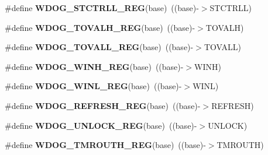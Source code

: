 \begin{DoxyCompactItemize}
\item 
\#define {\bfseries W\+D\+O\+G\+\_\+\+S\+T\+C\+T\+R\+L\+L\+\_\+\+R\+EG}(base)~((base)-\/$>$S\+T\+C\+T\+R\+LL)\hypertarget{group__WDOG__Register__Accessor__Macros_ga9390a99165a8ed47a8d47310dd1b7a44}{}\label{group__WDOG__Register__Accessor__Macros_ga9390a99165a8ed47a8d47310dd1b7a44}

\item 
\#define {\bfseries W\+D\+O\+G\+\_\+\+T\+O\+V\+A\+L\+H\+\_\+\+R\+EG}(base)~((base)-\/$>$T\+O\+V\+A\+LH)\hypertarget{group__WDOG__Register__Accessor__Macros_ga3495178bd50541f858403de84b2132df}{}\label{group__WDOG__Register__Accessor__Macros_ga3495178bd50541f858403de84b2132df}

\item 
\#define {\bfseries W\+D\+O\+G\+\_\+\+T\+O\+V\+A\+L\+L\+\_\+\+R\+EG}(base)~((base)-\/$>$T\+O\+V\+A\+LL)\hypertarget{group__WDOG__Register__Accessor__Macros_ga5867725d00829838e63aa304cd8e571e}{}\label{group__WDOG__Register__Accessor__Macros_ga5867725d00829838e63aa304cd8e571e}

\item 
\#define {\bfseries W\+D\+O\+G\+\_\+\+W\+I\+N\+H\+\_\+\+R\+EG}(base)~((base)-\/$>$W\+I\+NH)\hypertarget{group__WDOG__Register__Accessor__Macros_ga044a2078fb0f549de3bd68c329f4defb}{}\label{group__WDOG__Register__Accessor__Macros_ga044a2078fb0f549de3bd68c329f4defb}

\item 
\#define {\bfseries W\+D\+O\+G\+\_\+\+W\+I\+N\+L\+\_\+\+R\+EG}(base)~((base)-\/$>$W\+I\+NL)\hypertarget{group__WDOG__Register__Accessor__Macros_ga6de8f153524881bc674e0c1bf87529f3}{}\label{group__WDOG__Register__Accessor__Macros_ga6de8f153524881bc674e0c1bf87529f3}

\item 
\#define {\bfseries W\+D\+O\+G\+\_\+\+R\+E\+F\+R\+E\+S\+H\+\_\+\+R\+EG}(base)~((base)-\/$>$R\+E\+F\+R\+E\+SH)\hypertarget{group__WDOG__Register__Accessor__Macros_ga3ea0555f4cb61c5280404f2a46b2895d}{}\label{group__WDOG__Register__Accessor__Macros_ga3ea0555f4cb61c5280404f2a46b2895d}

\item 
\#define {\bfseries W\+D\+O\+G\+\_\+\+U\+N\+L\+O\+C\+K\+\_\+\+R\+EG}(base)~((base)-\/$>$U\+N\+L\+O\+CK)\hypertarget{group__WDOG__Register__Accessor__Macros_ga7f3bae362f30d21d2036bc38e216b40a}{}\label{group__WDOG__Register__Accessor__Macros_ga7f3bae362f30d21d2036bc38e216b40a}

\item 
\#define {\bfseries W\+D\+O\+G\+\_\+\+T\+M\+R\+O\+U\+T\+H\+\_\+\+R\+EG}(base)~((base)-\/$>$T\+M\+R\+O\+U\+TH)\hypertarget{group__WDOG__Register__Accessor__Macros_gad347a017205966537d23260e4ad0a7cc}{}\label{group__WDOG__Register__Accessor__Macros_gad347a017205966537d23260e4ad0a7cc}


\end{DoxyCompactItemize}
